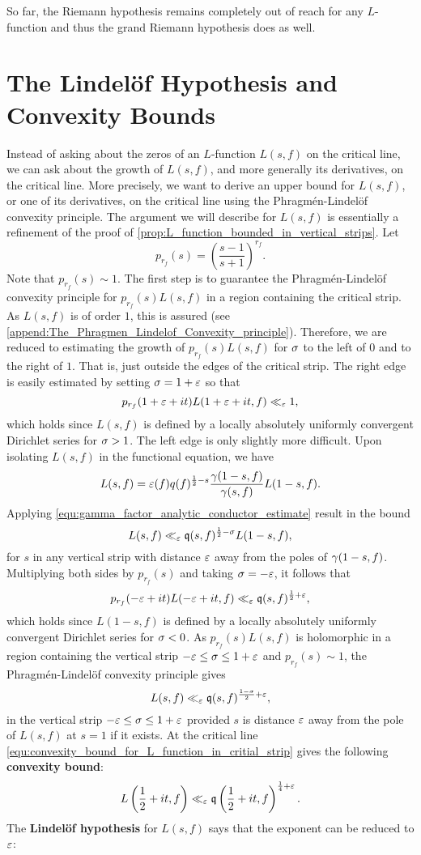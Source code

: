     So far, the Riemann hypothesis remains completely out of reach for any $L$-function and thus the grand Riemann hypothesis does as well.
  \section{The Lindel\"of Hypothesis and Convexity Bounds}
    Instead of asking about the zeros of an $L$-function $L(s,f)$ on the critical line, we can ask about the growth of $L(s,f)$, and more generally its derivatives, on the critical line. More precisely, we want to derive an upper bound for $L(s,f)$, or one of its derivatives, on the critical line using the Phragm\'en-Lindel\"of convexity principle. The argument we will describe for $L(s,f)$ is essentially a refinement of the proof of \cref{prop:L_function_bounded_in_vertical_strips}. Let
    \[
      p_{r_{f}}(s) = \left(\frac{s-1}{s+1}\right)^{r_{f}}.
    \]
    Note that $p_{r_{f}}(s) \sim 1$. The first step is to guarantee the Phragm\'en-Lindel\"of convexity principle for $p_{r_{f}}(s)L(s,f)$ in a region containing the critical strip. As $L(s,f)$ is of order $1$, this is assured (see \cref{append:The_Phragmen_Lindelof_Convexity_principle}). Therefore, we are reduced to estimating the growth of $p_{r_{f}}(s)L(s,f)$ for $\sigma$ to the left of $0$ and to the right of $1$. That is, just outside the edges of the critical strip. The right edge is easily estimated by setting $\sigma = 1+\varepsilon$ so that
    \[
      p_{r_{f}}(1+\varepsilon+it)L(1+\varepsilon+it,f) \ll_{\varepsilon} 1,
    \]
    which holds since $L(s,f)$ is defined by a locally absolutely uniformly convergent Dirichlet series for $\sigma > 1$. The left edge is only slightly more difficult. Upon isolating $L(s,f)$ in the functional equation, we have
    \[
      L(s,f) = \varepsilon(f)q(f)^{\frac{1}{2}-s}\frac{\gamma(1-s,f)}{\gamma(s,f)}L(1-s,f).
    \]
    Applying \cref{equ:gamma_factor_analytic_conductor_estimate} result in the bound
    \[
      L(s,f) \ll_{\varepsilon} \mathfrak{q}(s,f)^{\frac{1}{2}-\sigma}L(1-s,f),
    \]
    for $s$ in any vertical strip with distance $\varepsilon$ away from the poles of $\gamma(1-s,f)$. Multiplying both sides by $p_{r_{f}}(s)$ and taking $\sigma = -\varepsilon$, it follows that
    \[
      p_{r_{f}}(-\varepsilon+it)L(-\varepsilon+it,f) \ll_{\varepsilon} \mathfrak{q}(s,f)^{\frac{1}{2}+\varepsilon},
    \]
    which holds since $L(1-s,f)$ is defined by a locally absolutely uniformly convergent Dirichlet series for $\sigma < 0$. As $p_{r_{f}}(s)L(s,f)$ is holomorphic in a region containing the vertical strip $-\varepsilon \le \sigma \le 1+\varepsilon$ and $p_{r_{f}}(s) \sim 1$, the Phragm\'en-Lindel\"of convexity principle gives
    \begin{equation}\label{equ:convexity_bound_for_L_function_in_critial_strip}
      L(s,f) \ll_{\varepsilon} \mathfrak{q}(s,f)^{\frac{1-\sigma}{2}+\varepsilon},
    \end{equation}
    in the vertical strip $-\varepsilon \le \sigma \le 1+\varepsilon$ provided $s$ is distance $\varepsilon$ away from the pole of $L(s,f)$ at $s = 1$ if it exists. At the critical line \cref{equ:convexity_bound_for_L_function_in_critial_strip} gives the following \textbf{convexity bound}:
    \[
      L\left(\frac{1}{2}+it,f\right) \ll_{\varepsilon} \mathfrak{q}\left(\frac{1}{2}+it,f\right)^{\frac{1}{4}+\varepsilon}.
    \]
    The \textbf{Lindel\"of hypothesis} for $L(s,f)$ says that the exponent can be reduced to $\varepsilon$:

